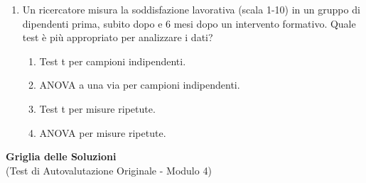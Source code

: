 \documentclass[12pt, a4paper]{article}
\begin{document}
\begin{enumerate}
     \item Un ricercatore misura la soddisfazione lavorativa (scala 1-10) in un gruppo di dipendenti prima, subito dopo e 6 mesi dopo un intervento formativo. Quale test è più appropriato per analizzare i dati?
    \begin{enumerate}
        \item Test t per campioni indipendenti.
        \item ANOVA a una via per campioni indipendenti.
        \item Test t per misure ripetute.
        \item ANOVA per misure ripetute.
    \end{enumerate}


\end{enumerate} %

\newpage %

\begin{center}
    \Large\textbf{Griglia delle Soluzioni} \\
    \vspace{0.5cm}
    \normalsize{(Test di Autovalutazione Originale - Modulo 4)}
\end{center}
\vspace{1cm}
\end{document}
